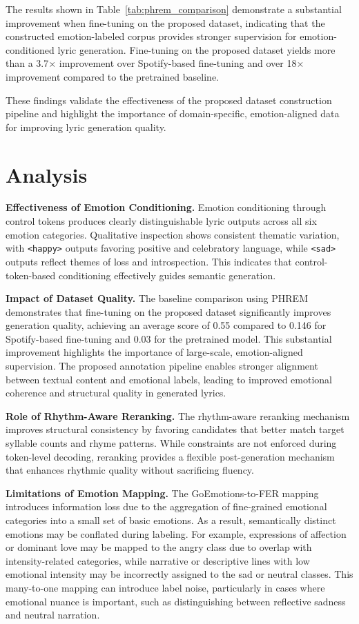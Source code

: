 \documentclass[11pt]{article}
\begin{document}
The results shown in Table~\ref{tab:phrem_comparison} demonstrate a substantial improvement when fine-tuning on the proposed dataset, indicating that the constructed emotion-labeled corpus provides stronger supervision for emotion-conditioned lyric generation. Fine-tuning on the proposed dataset yields more than a 3.7$\times$ improvement over Spotify-based fine-tuning and over 18$\times$ improvement compared to the pretrained baseline.

These findings validate the effectiveness of the proposed dataset construction pipeline and highlight the importance of domain-specific, emotion-aligned data for improving lyric generation quality.

\section{Analysis}

\textbf{Effectiveness of Emotion Conditioning.}
Emotion conditioning through control tokens produces clearly distinguishable 
lyric outputs across all six emotion categories. Qualitative inspection shows 
consistent thematic variation, with \texttt{<happy>} outputs favoring positive 
and celebratory language, while \texttt{<sad>} outputs reflect themes of loss 
and introspection. This indicates that control-token-based conditioning effectively 
guides semantic generation.

\textbf{Impact of Dataset Quality.}
The baseline comparison using PHREM demonstrates that fine-tuning on the proposed 
dataset significantly improves generation quality, achieving an average score of 
0.55 compared to 0.146 for Spotify-based fine-tuning and 0.03 for the pretrained 
model. This substantial improvement highlights the importance of large-scale, 
emotion-aligned supervision. The proposed annotation pipeline enables stronger 
alignment between textual content and emotional labels, leading to improved 
emotional coherence and structural quality in generated lyrics.

\textbf{Role of Rhythm-Aware Reranking.}
The rhythm-aware reranking mechanism improves structural consistency by favoring 
candidates that better match target syllable counts and rhyme patterns. 
While constraints are not enforced during token-level decoding, reranking provides 
a flexible post-generation mechanism that enhances rhythmic quality without sacrificing 
fluency.

\textbf{Limitations of Emotion Mapping.}
The GoEmotions-to-FER mapping introduces information loss due to the aggregation 
of fine-grained emotional categories into a small set of basic emotions. As a result, 
semantically distinct emotions may be conflated during labeling. For example, 
expressions of affection or dominant love may be mapped to the angry class due to 
overlap with intensity-related categories, while narrative or descriptive lines with 
low emotional intensity may be incorrectly assigned to the sad or neutral classes. 
This many-to-one mapping can introduce label noise, particularly in cases where emotional 
nuance is important, such as distinguishing between reflective sadness and neutral narration.
\end{document}
